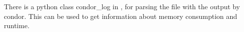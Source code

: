 There is a python class condor\_log in
, for parsing the file with the output
by condor. This can be used to get information about memory consumption
and runtime.





